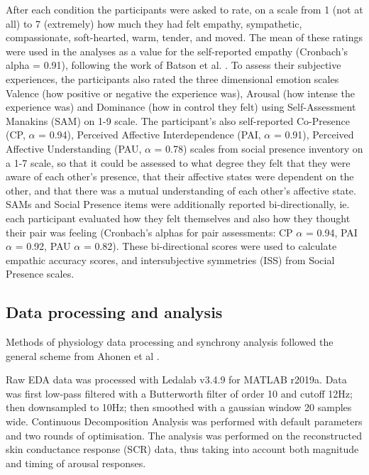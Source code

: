 \documentclass[manuscript, review = false, screen]{acmart}
\begin{document}
After each condition the participants were asked to rate, on a scale from 1 (not at all) to 7 (extremely) how much they had felt empathy, sympathetic, compassionate, soft-hearted, warm, tender, and moved. The mean of these ratings were used in the analyses as a value for the self-reported empathy (Cronbach's alpha = 0.91), following the work of Batson et al. \cite{Batson1987}. To assess their subjective experiences, the participants also rated the three dimensional emotion scales Valence (how positive or negative the experience was), Arousal (how intense the experience was) and Dominance (how in control they felt) using Self-Assessment Manakins (SAM) \cite{Bradley_Lang_1994} on 1-9 scale. The participant's also self-reported Co-Presence (CP, $\alpha$ = 0.94), Perceived Affective Interdependence (PAI, $\alpha$ = 0.91), Perceived Affective Understanding (PAU, $\alpha$ = 0.78) scales from social presence inventory \cite{Biocca_Harms_2003} on a 1-7 scale, so that it could be assessed to what degree they felt that they were aware of each other's presence, that their affective states were dependent on the other, and that there was a mutual understanding of each other's affective state. SAMs and Social Presence items were additionally reported bi-directionally, ie. each participant evaluated how they felt themselves and also how they thought their pair was feeling (Cronbach's alphas for pair assessments: CP $\alpha$ = 0.94, PAI $\alpha$ = 0.92, PAU $\alpha$ = 0.82). These bi-directional scores were used to calculate empathic accuracy scores, and intersubjective symmetries (ISS) from Social Presence scales.


\subsection{Data processing and analysis}
Methods of physiology data processing and synchrony analysis followed the general scheme from Ahonen et al \cite{Ahonen2016paircode,Ahonen2018paircode}.

Raw EDA data was processed with Ledalab v3.4.9 \cite{Benedek_Kaernbach_2010} for MATLAB r2019a. Data was first low-pass filtered with a Butterworth filter of order 10 and cutoff 12Hz; then downsampled to 10Hz; then smoothed with a gaussian window 20 samples wide. Continuous Decomposition Analysis was performed with default parameters and two rounds of optimisation. The analysis was performed on the reconstructed skin conductance response (SCR) data, thus taking into account both magnitude and timing of arousal responses.
\end{document}
